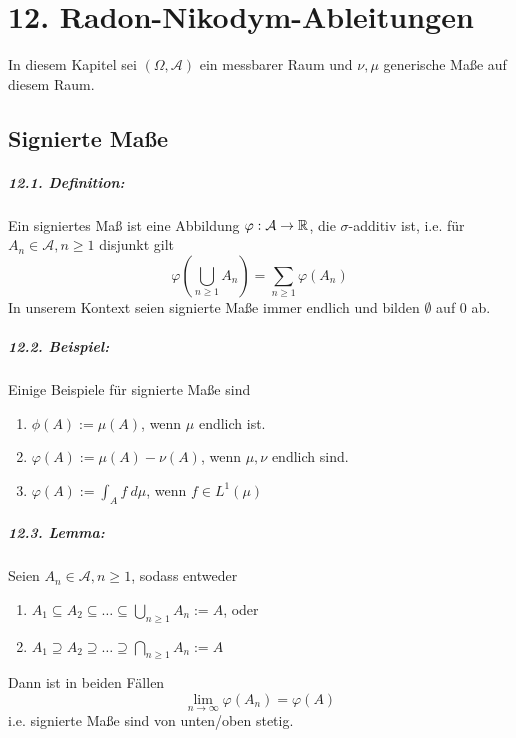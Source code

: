 \chapter*{12. Radon-Nikodym-Ableitungen}
In diesem Kapitel sei $(\Omega,\mathcal{A})$ ein messbarer Raum und $\nu,\mu$ generische Ma\ss{}e auf diesem Raum.
\section*{Signierte Ma\ss{}e}
 
 \paragraph{12.1. Definition:} Ein signiertes Ma\ss{} ist eine Abbildung $\varphi:\mathcal{A}\to\mathbb{R}$, die $\sigma$-additiv ist, i.e. f\"ur $A_n\in\mathcal{A},n\geq1$ disjunkt gilt
 $$\varphi\left(\bigcup_{n\geq1}A_n\right)=\sum_{n\geq1}\varphi(A_n)$$
 In unserem Kontext seien signierte Ma\ss{}e immer endlich und bilden $\emptyset$ auf $0$ ab.
 
 \paragraph{12.2. Beispiel:} Einige Beispiele f\"ur signierte Ma\ss{}e sind
 \begin{enumerate}[label=(\roman*)]
     \item $\phi(A):=\mu(A)$, wenn $\mu$ endlich ist.
     \item $\varphi(A):=\mu(A)-\nu(A)$, wenn $\mu,\nu$ endlich sind.
     \item $\varphi(A):=\int_A f\ d\mu$, wenn $f\in L^1(\mu)$
 \end{enumerate}
 
 \paragraph{12.3. Lemma:} Seien $A_n\in\mathcal{A},n\geq1$, sodass entweder
 \begin{enumerate}[label=(\roman*)]
     \item $A_1\subseteq A_2\subseteq\hdots\subseteq\bigcup_{n\geq1}A_n:=A$, oder
     \item $A_1\supseteq A_2\supseteq\hdots\supseteq\bigcap_{n\geq1}A_n:=A$
 \end{enumerate}
 Dann ist in beiden F\"allen 
 $$\lim_{n\to\infty}\varphi(A_n)=\varphi(A)$$
 i.e. signierte Ma\ss{}e sind von unten/oben stetig.
 
